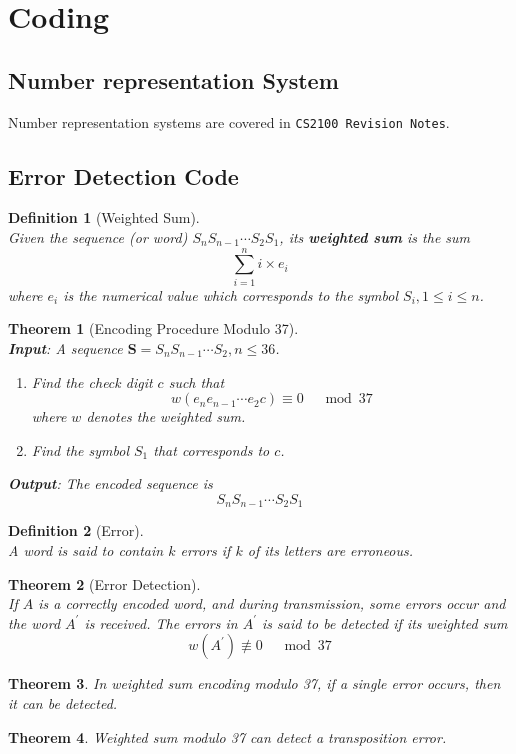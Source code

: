 \documentclass[12pt]{article}
\newtheorem{definition}{Definition}[section]
\newtheorem{theorem}{Theorem}[section]
\theoremstyle{definition}
\begin{document}
\section{Coding}
\subsection{Number representation System}
Number representation systems are covered in \texttt{CS2100 Revision Notes}.
\subsection{Error Detection Code}
\begin{definition}[Weighted Sum]
\hfill\\\normalfont Given the sequence (or word) $S_nS_{n-1}\cdots S_2S_1$, its \textbf{weighted sum} is the sum
\[
\sum_{i=1}^n i\times e_i
\]
where $e_i$ is the numerical value which corresponds to the symbol $S_i, 1\leq i\leq n$.
\end{definition}
\begin{theorem}[Encoding Procedure Modulo 37]
\hfill\\\normalfont
\textbf{Input}: A sequence $\mathbf{S} = S_nS_{n-1}\cdots S_2, n\leq 36$.
\begin{enumerate}
  \item Find the \textit{check digit} $c$ such that
  \[
w(e_ne_{n-1}\cdots e_2c)\equiv 0\;\;\; \mod 37
  \]
  where $w$ denotes the weighted sum.
  \item Find the symbol $S_1$ that corresponds to $c$.
\end{enumerate}
\textbf{Output}: The encoded sequence is
\[
S_nS_{n-1}\cdots S_2S_1
\]
\end{theorem}
\begin{definition}[Error]
\hfill\\\normalfont A word is said to contain $k$ errors if $k$ of its letters are erroneous.
\end{definition}
\begin{theorem}[Error Detection]
\hfill\\\normalfont If $A$ is a correctly encoded word, and during transmission, some errors occur and the word $A^\prime$ is received. The errors in $A^\prime$ is said to be detected if its weighted sum
\[
w(A^\prime)\not\equiv 0\;\;\; \mod 37
\]
\end{theorem}
\begin{theorem}\normalfont In weighted sum encoding modulo 37, if a single error occurs, then it can be detected.
\end{theorem}
\begin{theorem}\normalfont Weighted sum modulo 37 can detect a transposition error.\end{theorem}
\end{document}
